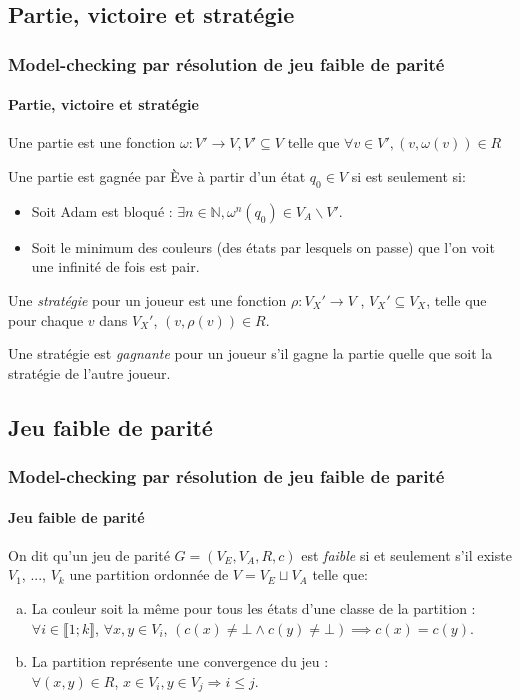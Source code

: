 \documentclass[11pt]{beamer}
\begin{document}
\subsection{Partie, victoire et stratégie}
\begin{frame}
    \frametitle{Model-checking par résolution de jeu faible de parité}
    \framesubtitle{Partie, victoire et stratégie}

    Une partie est une fonction $\omega : V' \to V, V' \subseteq V$ telle que $\forall v \in V', (v,\omega(v)) \in R$

    \pause
    \bigskip

    Une partie est gagnée par Ève à partir d'un état $q_0 \in V$ si est seulement si:
    \begin{itemize}
    \item Soit Adam est bloqué : $\exists n \in \mathbb{N}, \omega^n (q_0) \in V_A\backslash V'$.
    \item Soit le minimum des couleurs (des états par lesquels on passe) que l'on voit une infinité de fois est pair.
    \end{itemize}

    \pause
    \bigskip

	Une \emph{stratégie} pour un joueur est une fonction $\rho : V_X' \to V$ , $V_X' \subseteq V_X$, telle que pour chaque $v$ dans $V_X'$, $(v, \rho(v)) \in R$.

	\bigskip

    Une stratégie est \emph{gagnante} pour un joueur s'il gagne la partie quelle que soit la stratégie de l'autre joueur.
\end{frame}

\subsection{Jeu faible de parité}
\begin{frame}
    \frametitle{Model-checking par résolution de jeu faible de parité}
    \framesubtitle{Jeu faible de parité}

    On dit qu'un jeu de parité $G = (V_E,V_A,R,c)$ est \emph{faible}  si et seulement s'il existe $V_1$, ..., $V_k$ une partition ordonnée de $V = V_E \sqcup V_A$ telle que:
    \begin{enumerate}[a)]
    \item La couleur soit la même pour tous les états d'une classe de la partition : $\forall i \in \llbracket 1 ; k \rrbracket$, $\forall x, y \in V_i$, $(c(x) \neq \bot \land c(y) \neq \bot)  \implies c(x) = c(y)$.
    \item La partition représente une convergence du jeu :\\
    $\forall (x, y) \in R$, $x\in V_i, y \in V_j \Rightarrow i \leq j$.
    \end{enumerate}
\end{frame}
\end{document}
